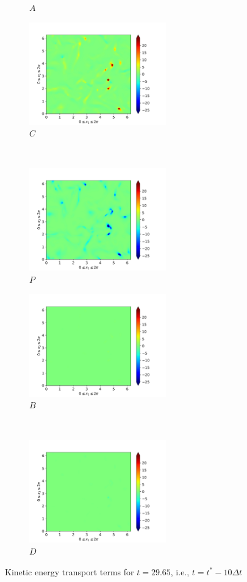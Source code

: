 \begin{figure}[H]
\begin{subfigure}{0.45\textwidth}
        \caption{$A$}
    \end{subfigure}
    \newline
    \begin{subfigure}{0.45\textwidth}
        \includegraphics[height=1.75in]{media/run-cds-65/C-ke-1330}
        \caption{$C$}
    \end{subfigure}
    ~
    \begin{subfigure}{0.45\textwidth}
        \includegraphics[height=1.75in]{media/run-cds-65/P-ke-1330}
        \caption{$P$}
    \end{subfigure}
    \newline
    \begin{subfigure}{0.45\textwidth}
        \includegraphics[height=1.75in]{media/run-cds-65/B-ke-1330}
        \caption{$B$}
    \end{subfigure}
    ~
    \begin{subfigure}{0.45\textwidth}
        \includegraphics[height=1.75in]{media/run-cds-65/D-ke-1330}
        \caption{$D$}
    \end{subfigure}
    \caption{Kinetic energy transport terms for $t=29.65$, i.e., $t=t^{\ast} - 10 \Delta t$}
\end{figure}

